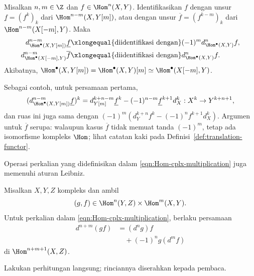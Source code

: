 \begin{lema}\label{prop:Hom-cplx-d-translate}
	Misalkan $n,m\in\Z$ dan $f\in\Hom^n(X,Y)$. Identifikasikan $f$ dengan
	unsur $\underline{f}=(f^k)_k$ dari $\Hom^{n-m}(X,Y[m])$, atau dengan
	unsur $\overline{f}=(f^{k-m})_k$ dari $\Hom^{n-m}(X[-m],Y)$. Maka
	\begin{align*}
		d^{n-m}_{\Hom^\bullet(X, Y[m])} \underline{f} & \xlongequal{\text{diidentifikasi dengan}} (-1)^m d^n_{\Hom^\bullet(X, Y)} f, \\ d^{n-m}_{\Hom^\bullet(X[-m], Y)} \overline{f} & \xlongequal{\text{diidentifikasi dengan}} d^n_{\Hom^\bullet(X, Y)} f.
	\end{align*}
	Akibatnya,
	$\Hom^\bullet(X,Y[m])=\Hom^\bullet(X,Y)[m]\simeq
	\Hom^\bullet(X[-m],Y)$.
\end{lema}
\begin{bukti}
	Sebagai contoh, untuk persamaan pertama,
	\[ (d^{n-m}_{\Hom^\bullet(X, Y[m])} \underline{f})^k = d_{Y[m]}^{k+n-m} \underline{f}^k - (-1)^{n-m} \underline{f}^{k+1} d_X^k : X^k \to Y^{k+n+1}, \]
	dan ruas ini juga sama dengan
	$(-1)^m\left(d_Y^{k+n}f^k-(-1)^nf^{k+1}d_X^k\right)$. Argumen untuk
	$\overline{f}$ serupa: walaupun kasus $\overline{f}$ tidak memuat
	tanda $(-1)^m$, tetap ada isomorfisme kompleks $\Hom$; lihat catatan kaki
	pada Definisi~\ref{def:translation-functor}.
\end{bukti}

Operasi perkalian yang didefinisikan dalam
\eqref{eqn:Hom-cplx-multiplication} juga memenuhi aturan Leibniz.

\begin{lema}\label{prop:Hom-cplx-Leibniz}
	Misalkan $X,Y,Z$ kompleks dan ambil
	\[
		(g,f)\in\Hom^n(Y,Z)\times\Hom^m(X,Y).
	\]
	Untuk perkalian dalam \eqref{eqn:Hom-cplx-multiplication}, berlaku persamaan
	\[
		\begin{aligned}
			d^{n+m}(gf)
				&= (d^n g)f \\
				&\quad + (-1)^n g(d^m f)
		\end{aligned}
	\]
	di $\Hom^{n+m+1}(X,Z)$.
\end{lema}
\begin{bukti}
	Lakukan perhitungan langsung; rinciannya diserahkan kepada pembaca.
\end{bukti}

